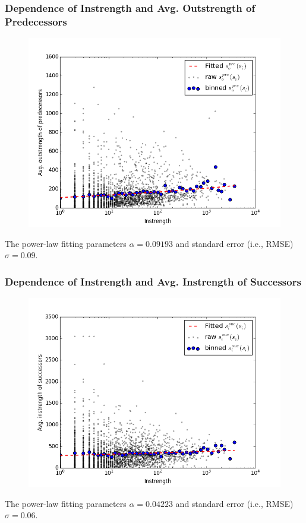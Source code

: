 \documentclass{beamer}
\begin{document}
\begin{frame}
\frametitle{Dependence of Instrength and Avg. Outstrength of Predecessors}
\begin{figure}
\includegraphics[width=0.8\linewidth]{figs/pre_out_in_s.png}
\end{figure}
\small{The power-law fitting parameters $\alpha=0.09193$ and standard error (i.e., RMSE) $\sigma=0.09$.}
\end{frame}


\begin{frame}
\frametitle{Dependence of Instrength and Avg. Instrength of Successors}
\begin{figure}
\includegraphics[width=0.8\linewidth]{figs/suc_in_in_s.png}
\end{figure}
\small{The power-law fitting parameters $\alpha=0.04223$ and standard error (i.e., RMSE) $\sigma=0.06$.}
\end{frame}
\end{document}
